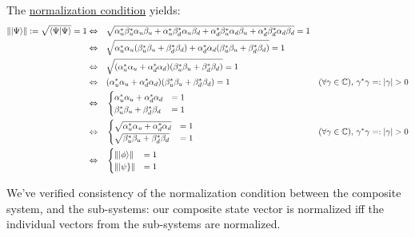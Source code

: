 \documentclass[solutions.tex]{subfiles}
\begin{document}
The \underline{normalization condition} yields:
\begin{equation*}\begin{aligned}
	\lVert |\Psi\rangle \rVert := \sqrt{\left\langle \Psi \middle| \Psi \right\rangle} =1 &\Leftrightarrow &&
		\sqrt{
			\alpha_u^*\beta_u^*\alpha_u\beta_u
			+\alpha_u^*\beta_d^*\alpha_u\beta_d
			+\alpha_d^*\beta_u^*\alpha_d\beta_u
			+\alpha_d^*\beta_d^*\alpha_d\beta_d
		} = 1 \\
	~ &\Leftrightarrow&&
		\sqrt{
			\alpha_u^*\alpha_u(\beta_u^*\beta_u+\beta_d^*\beta_d)
			+\alpha_d^*\alpha_d(\beta_u^*\beta_u+\beta_d^*\beta_d)
		} = 1 \\
	~ &\Leftrightarrow&&
		\sqrt{
			(\alpha_u^*\alpha_u+\alpha_d^*\alpha_d)
			(\beta_u^*\beta_u+\beta_d^*\beta_d)
		} = 1 \\
	~ &\Leftrightarrow&&
		(\alpha_u^*\alpha_u+\alpha_d^*\alpha_d)
		(\beta_u^*\beta_u+\beta_d^*\beta_d) = 1 &
			(\forall\gamma\in\mathbb{C}),\,\gamma^*\gamma=:|\gamma| > 0 \\
	~ &\Leftrightarrow&&
		\begin{cases}
			\alpha_u^*\alpha_u+\alpha_d^*\alpha_d &= 1 \\
			\beta_u^*\beta_u+\beta_d^*\beta_d &= 1 \\
		\end{cases} \\
	~ &\Leftrightarrow&&
		\begin{cases}
			\sqrt{\alpha_u^*\alpha_u+\alpha_d^*\alpha_d} &= 1 \\
			\sqrt{\beta_u^*\beta_u+\beta_d^*\beta_d} &= 1 \\
		\end{cases}&
			(\forall\gamma\in\mathbb{C}),\,\gamma^*\gamma=:|\gamma| > 0 \\
	~ &\Leftrightarrow&&
		\begin{cases}
			\lVert |\phi\rangle \rVert &= 1 \\
			\lVert |\psi\} \rVert &= 1 \\
		\end{cases} \\
\end{aligned}\end{equation*}

We've verified consistency of the normalization condition
between the composite system, and the sub-systems: our composite state vector
is normalized iff the individual vectors from the sub-systems are
normalized. \\
\end{document}
